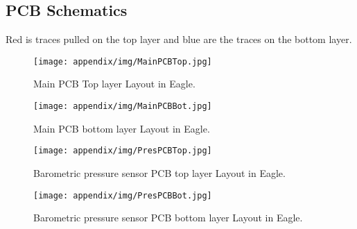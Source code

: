 \subsection{PCB Schematics}
\label{sec:pcbSchematics}
Red is traces pulled on the top layer and blue are the traces on the bottom layer.
\begin{figure}[H]
    \centering
    \texttt{[image: appendix/img/MainPCBTop.jpg]}
    \caption{Main PCB Top layer Layout in Eagle.}
    \label{fig:PCBinEagle}
\end{figure}

\begin{figure}[H]
    \centering
    \texttt{[image: appendix/img/MainPCBBot.jpg]}
    \caption{Main PCB bottom layer Layout in Eagle.}
    \label{fig:PCBinEagle}
\end{figure}

\begin{figure}[H]
    \centering
    \texttt{[image: appendix/img/PresPCBTop.jpg]}
    \caption{Barometric pressure sensor PCB top layer Layout in Eagle.}
    \label{fig:PCBinEagle}
\end{figure}

\begin{figure}[H]
    \centering
    \texttt{[image: appendix/img/PresPCBBot.jpg]}
    \caption{Barometric pressure sensor PCB bottom layer Layout in Eagle.}
    \label{fig:PCBinEagle}
\end{figure}
